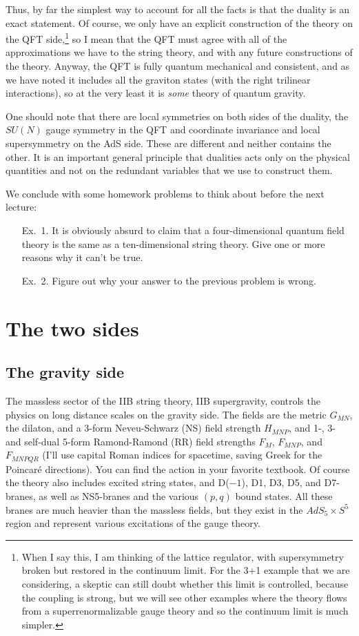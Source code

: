 \documentclass[12pt]{article}
\newcommand{\sect}[1]{\section{#1}\setcounter{equation}{0}}
\begin{document}
{Thus, by far the simplest way to account for all the facts is that the duality is an exact statement.  Of course, we only have an explicit construction of the theory on the QFT side,\footnote{When I say this, I am thinking of the lattice regulator, with supersymmetry broken but restored in the continuum limit.  For the 3+1 example that we are considering, a skeptic can still doubt whether this limit is controlled, because the coupling is strong, but we will see other examples where the theory flows from a superrenormalizable gauge theory and so the continuum limit is much simpler.} so I mean that the QFT must agree with all of the approximations we have to the string theory, and with any future constructions of the theory.  Anyway, the QFT is fully quantum mechanical and consistent, and as we have noted it includes all the graviton states (with the right trilinear interactions), so at the very least it is {\it some} theory of quantum gravity.

One should note that there are local symmetries on both sides of the duality, the $SU(N)$ gauge symmetry in the QFT and coordinate invariance and local supersymmetry on the AdS side.  These are different and neither contains the other.  It is an important general principle that dualities acts only on the physical quantities and not on the redundant variables that we use to construct them.

We conclude with some homework problems to think about before the next lecture:
\begin{enumerate}

\item[Ex.\ 1.]It is obviously absurd to claim that a four-dimensional quantum field theory is the same as a ten-dimensional string theory.  Give one or more reasons why it can't be true.

\item[Ex.\ 2.] Figure out why your answer to the previous problem is wrong.
\end{enumerate}


\sect{The two sides}

\subsection{The gravity side}

The massless sector of the IIB string theory, IIB supergravity, controls the physics on long distance scales on the gravity side.  The fields are the metric $G_{MN}$, the dilaton, and a 3-form Neveu-Schwarz (NS) field strength $H_{MNP}$, and 1-, 3- and self-dual 5-form Ramond-Ramond (RR) field strengths $F_M$, $F_{MNP}$, and $F_{MNPQR}$ (I'll use capital Roman indices for spacetime, saving Greek for the Poincar\'e directions).  You can find the action in your favorite textbook.  Of course the theory also includes excited string states, and D($-1$), D1, D3, D5, and D7-branes, as well as NS5-branes and the various $(p,q)$ bound states.  All these branes are much heavier than the massless fields, but they exist in the $AdS_5 \times S^5$ region and represent various excitations of the gauge theory.

}
\end{document}
